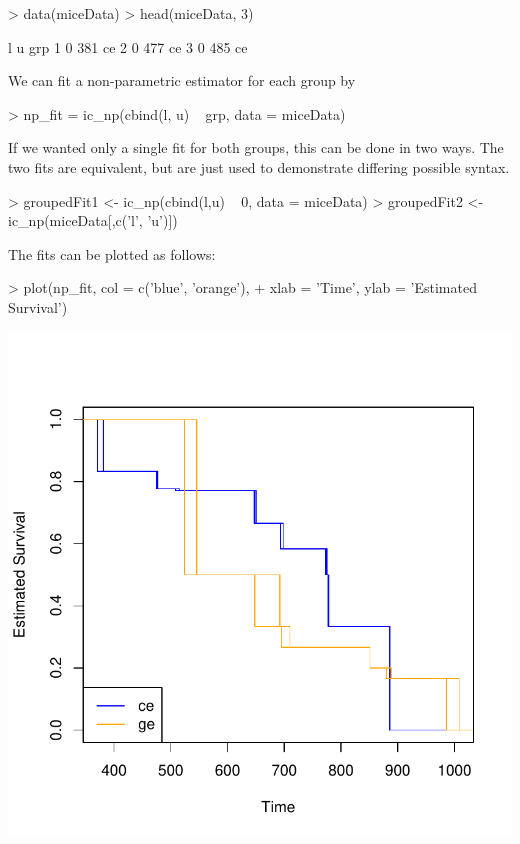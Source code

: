 \documentclass[a4paper]{article}
\begin{document}
  
\begin{Schunk}
\begin{Sinput}
> data(miceData)
> head(miceData, 3)
\end{Sinput}
\begin{Soutput}
  l   u grp
1 0 381  ce
2 0 477  ce
3 0 485  ce
\end{Soutput}
\end{Schunk}
  
We can fit a non-parametric estimator for each group by 

\begin{Schunk}
\begin{Sinput}
> np_fit = ic_np(cbind(l, u) ~ grp, data = miceData)
\end{Sinput}
\end{Schunk}

If we wanted only a single fit for both groups, this can be done in two ways. The two fits are equivalent, but are just used to demonstrate differing possible syntax. 
  
\begin{Schunk}
\begin{Sinput}
> groupedFit1 <- ic_np(cbind(l,u) ~ 0, data = miceData)
> groupedFit2 <- ic_np(miceData[,c('l', 'u')])
\end{Sinput}
\end{Schunk}

The fits can be plotted as follows:

\begin{Schunk}
\begin{Sinput}
> plot(np_fit, col = c('blue', 'orange'),
+      xlab = 'Time', ylab = 'Estimated Survival')
\end{Sinput}
\end{Schunk}
\includegraphics{icenReg-005}
\end{document}
